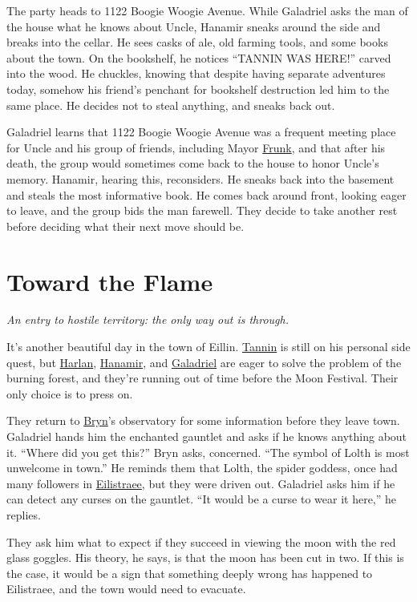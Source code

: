\documentclass[smalldemyvopaper,11pt,twoside,onecolumn,openright,extrafontsizes]{memoir}
\newcommand{\chapdesc}[1]{
    \begin{flushright}
    \emph{{#1}}
    \end{flushright}
    \vspace{26pt}
}
\begin{document}
The party heads to 1122 Boogie Woogie Avenue. While Galadriel asks the
man of the house what he knows about Uncle, Hanamir sneaks around the
side and breaks into the cellar. He sees casks of ale, old farming
tools, and some books about the town. On the bookshelf, he notices
``TANNIN WAS HERE!'' carved into the wood. He chuckles, knowing that
despite having separate adventures today, somehow his friend's penchant
for bookshelf destruction led him to the same place. He decides not to
steal anything, and sneaks back out.

Galadriel learns that 1122 Boogie Woogie Avenue was a frequent meeting
place for Uncle and his group of friends, including Mayor
\href{/characters/frunk/}{Frunk}, and that after his death, the group
would sometimes come back to the house to honor Uncle's memory. Hanamir,
hearing this, reconsiders. He sneaks back into the basement and steals
the most informative book. He comes back around front, looking eager to
leave, and the group bids the man farewell. They decide to take another
rest before deciding what their next move should be.


\chapter{Toward the Flame}
\chapdesc{An entry to hostile territory: the only way out is through.}

It's another beautiful day in the town of Eillin.
\href{/characters/tannin/}{Tannin} is still on his personal side quest,
but \href{/characters/harlan/}{Harlan},
\href{/characters/hanamir/}{Hanamir}, and
\href{/characters/galadriel/}{Galadriel} are eager to solve the problem
of the burning forest, and they're running out of time before the Moon
Festival. Their only choice is to press on.

They return to \href{/characters/bryn/}{Bryn}'s observatory for some
information before they leave town. Galadriel hands him the enchanted
gauntlet and asks if he knows anything about it. ``Where did you get
this?'' Bryn asks, concerned. ``The symbol of Lolth is most unwelcome in
town.'' He reminds them that Lolth, the spider goddess, once had many
followers in \href{/characters/eilistraee/}{Eilistraee}, but they were
driven out. Galadriel asks him if he can detect any curses on the
gauntlet. ``It would be a curse to wear it here,'' he replies.

They ask him what to expect if they succeed in viewing the moon with the
red glass goggles. His theory, he says, is that the moon has been cut in
two. If this is the case, it would be a sign that something deeply wrong
has happened to Eilistraee, and the town would need to evacuate.
\end{document}
